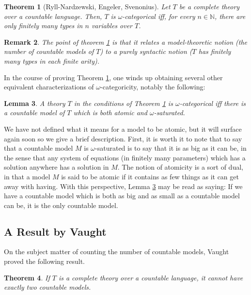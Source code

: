 \documentclass{article}
\newtheorem{theorem}{Theorem}[section]
\newtheorem{lemma}[theorem]{Lemma}
\newtheorem{remark}[theorem]{Remark}
\theoremstyle{nonumberplain}
\newcommand{\N}{\mathbb{N}}
\begin{document}
\begin{theorem}[Ryll-Nardzewski, Engeler, Svenonius]\label{thm:omegacat}
Let $T$ be a complete theory over a countable language. Then, $T$ is $\omega$-categorical iff, for every $n \in \N$, there are only finitely many types in $n$ variables over $T$.
\end{theorem}

\begin{remark}
The point of theorem \ref{thm:omegacat} is that it relates a model-theoretic notion (the number of countable models of $T$) to a purely syntactic notion ($T$ has finitely many types in each finite arity).
\end{remark}

In the course of proving Theorem \ref{thm:omegacat}, one winds up obtaining several other equivalent characterizations of $\omega$-categoricity, notably the following:
\begin{lemma}\label{lem:omegacat}
A theory $T$ in the conditions of Theorem \ref{thm:omegacat} is $\omega$-categorical iff there is a countable model of $T$ which is both atomic and $\omega$-saturated.
\end{lemma}

We have not defined what it means for a model to be atomic, but it will surface again soon so we give a brief description. First, it is worth it to note that to say that a countable model $M$ is $\omega$-saturated is to say that it is as big as it can be, in the sense that any system of equations (in finitely many parameters) which has a solution anywhere has a solution in $M$. The notion of atomicity is a sort of dual, in that a model $M$ is said to be atomic if it contains as few things as it can get away with having. With this perspective, Lemma \ref{lem:omegacat} may be read as saying: If we have a countable model which is both as big and as small as a countable model can be, it is the only countable model.

\subsection{A Result by Vaught}\label{sec:vaught}

On the subject matter of counting the number of countable models, Vaught proved the following result.

\begin{theorem}\label{thm:vaught}
If $T$ is a complete theory over a countable language, it cannot have exactly two countable models.
\end{theorem}
\end{document}
